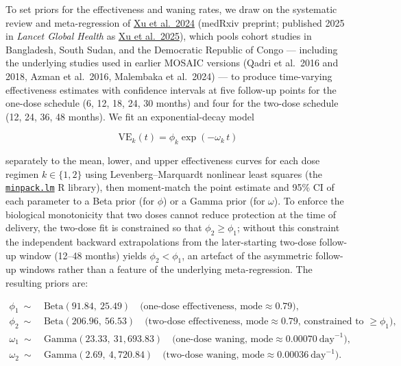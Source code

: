 \documentclass[
]{book}
\begin{document}
To set priors for the effectiveness and waning rates, we draw on the systematic review and meta-regression of \href{https://doi.org/10.1101/2024.08.13.24311930v2}{Xu et al.~2024} (medRxiv preprint; published 2025 in \emph{Lancet Global Health} as \href{https://doi.org/10.1016/S2214-109X(25)00107-X}{Xu et al.~2025}), which pools cohort studies in Bangladesh, South Sudan, and the Democratic Republic of Congo --- including the underlying studies used in earlier MOSAIC versions (Qadri et al.~2016 and 2018, Azman et al.~2016, Malembaka et al.~2024) --- to produce time-varying effectiveness estimates with confidence intervals at five follow-up points for the one-dose schedule (6, 12, 18, 24, 30 months) and four for the two-dose schedule (12, 24, 36, 48 months). We fit an exponential-decay model

\[
\text{VE}_k(t) = \phi_k \exp(-\omega_k\, t)
\]

separately to the mean, lower, and upper effectiveness curves for each dose regimen \(k \in \{1,2\}\) using Levenberg--Marquardt nonlinear least squares (the \href{https://rdrr.io/cran/minpack.lm/}{\texttt{minpack.lm}} R library), then moment-match the point estimate and 95\% CI of each parameter to a Beta prior (for \(\phi\)) or a Gamma prior (for \(\omega\)). To enforce the biological monotonicity that two doses cannot reduce protection at the time of delivery, the two-dose fit is constrained so that \(\phi_2 \ge \phi_1\); without this constraint the independent backward extrapolations from the later-starting two-dose follow-up window (12--48 months) yields \(\phi_2 < \phi_1\), an artefact of the asymmetric follow-up windows rather than a feature of the underlying meta-regression. The resulting priors are:

\[
\begin{aligned}
\phi_1 \ \sim\ & \text{Beta}(91.84,\ 25.49) \quad \text{(one-dose effectiveness, mode} \approx 0.79\text{)},\\
\phi_2 \ \sim\ & \text{Beta}(206.96,\ 56.53) \quad \text{(two-dose effectiveness, mode} \approx 0.79\text{, constrained to } \ge \phi_1\text{)},\\
\omega_1 \ \sim\ & \text{Gamma}(23.33,\ 31{,}693.83) \quad \text{(one-dose waning, mode} \approx 0.00070\ \text{day}^{-1}\text{)},\\
\omega_2 \ \sim\ & \text{Gamma}(2.69,\ 4{,}720.84) \quad \text{(two-dose waning, mode} \approx 0.00036\ \text{day}^{-1}\text{)}.
\end{aligned}
\label{eq:effectiveness}
\]
\end{document}

